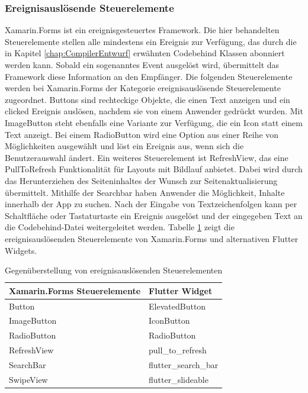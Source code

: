 \subsubsection{Ereignisauslösende Steuerelemente}
Xamarin.Forms ist ein ereignisgesteuertes Framework. Die hier behandelten Steuerelemente stellen alle mindestens ein Ereignis zur Verfügung,  das durch die in Kapitel \ref{chap:CompilerEntwurf} erwähnten Codebehind Klassen abonniert werden kann.  Sobald ein  sogenanntes Event ausgelöst wird,  übermittelt das Framework diese Information an den Empfänger.   Die folgenden Steuerelemente werden bei Xamarin.Forms der Kategorie ereignisauslösende Steuerelemente zugeordnet.  \glq Buttons\grq{} sind rechteckige Objekte,  die einen Text anzeigen und ein \glq clicked\grq{} Ereignis auslösen, nachdem sie von einem Anwender gedrückt wurden.  Mit \glq ImageButton\grq{} steht ebenfalls eine Variante zur Verfügung,  die ein Icon statt einem Text anzeigt.  Bei einem \glq RadioButton\grq{} wird eine Option aus einer Reihe von Möglichkeiten ausgewählt und löst ein Ereignis aus,  wenn sich die Benutzerauswahl ändert.  Ein weiteres Steuerelement ist \glq RefreshView\grq{}, das eine \glq PullToRefresh\grq{}  Funktionalität für Layouts mit Bildlauf anbietet.  Dabei wird durch das Herunterziehen des Seiteninhaltes der Wunsch zur Seitenaktualisierung  übermittelt.  Mithilfe der \glq Searchbar\grq{} haben Anwender die Möglichkeit, Inhalte  innerhalb der App zu suchen.  Nach der  Eingabe von Textzeichenfolgen kann per Schaltfläche oder Tastaturtaste ein Ereignis ausgelöst und der eingegeben Text an die Codebehind-Datei weitergeleitet werden.  Tabelle \ref{tab:eventcommands} zeigt die ereignisauslösenden Steuerelemente von Xamarin.Forms und alternativen Flutter Widgets.
\begin{table}[!ht]
\begin{tabularx}{\textwidth}{|X|X|}
\hline
   \textbf{Xamarin.Forms Steuerelemente} & \textbf{Flutter Widget}  \\
\hline
	Button		       				&  	ElevatedButton 		\\ 
	ImageButton		       		&  	IconButton 		\\ 
	RadioButton		       		&  	RadioButton 		\\ 
	RefreshView		       		&  	pull\_to\_refresh 		\\ 
	SearchBar		       			&  	flutter\_search\_bar 	\\ 
	SwipeView		       		&  	flutter\_slideable 		\\ 
\hline
\end{tabularx}
\caption{Gegenüberstellung von ereignisauslösenden Steuerelementen}
 \label{tab:eventcommands}
\end{table}

